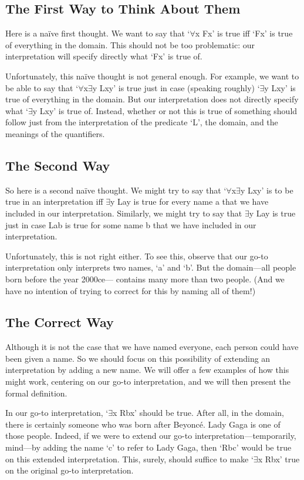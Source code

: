 \subsection{The First Way to Think About Them}

Here is a naïve first thought. We want to say that ‘$\forall$x Fx’ is true iff ‘Fx’ is true of everything in the domain. This should not be too problematic: our interpretation will specify directly what ‘Fx’ is true of.

Unfortunately, this naïve thought is not general enough. For example, we want to be able to say that ‘$\forall$x$\exists$y Lxy’ is true just in case (speaking roughly) ‘$\exists$y Lxy’ is true of everything in the domain. But our interpretation does not directly specify what ‘$\exists$y Lxy’ is true of. Instead, whether or not this is true of something should follow just from the interpretation of the predicate ‘L’, the domain, and the meanings of the quantifiers.

\subsection{The Second Way}

So here is a second naïve thought. We might try to say that ‘$\forall$x$\exists$y Lxy’ is to be true in an interpretation iff $\exists$y Lay is true for every name a that we have included in our interpretation. Similarly, we might try to say that $\exists$y Lay is true just in case Lab is true for some name b that we have included in our interpretation.

Unfortunately, this is not right either. To see this, observe that our go-to interpretation only interprets two names, ‘a’ and ‘b’. But the domain—all people born before the year 2000ce— contains many more than two people. (And we have no intention of trying to correct for this by naming all of them!)

\subsection{The Correct Way}

Although it is not the case that we have named everyone, each person could have been given a name. So we should focus on this possibility of extending an interpretation by adding a new name. We will offer a few examples of how this might work, centering on our go-to interpretation, and we will then present the formal definition.

In our go-to interpretation, ‘$\exists$x Rbx’ should be true. After all, in the domain, there is certainly someone who was born after Beyoncé. Lady Gaga is one of those people. Indeed, if we were to extend our go-to interpretation—temporarily, mind—by adding the name ‘c’ to refer to Lady Gaga, then ‘Rbc’ would be true on this extended interpretation. This, surely, should suffice to make ‘$\exists$x Rbx’ true on the original go-to interpretation.

